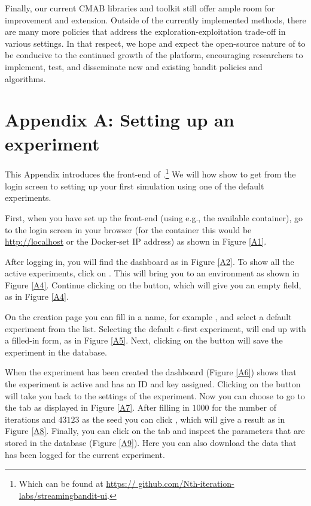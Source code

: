 \documentclass[nojss]{jss}
\begin{document}
Finally, our current CMAB libraries and toolkit still offer ample room for improvement and extension. Outside of the currently implemented methods, there are many more policies that address the exploration-exploitation trade-off in various settings. In that respect, we hope and expect the open-source nature of  to be conducive to the continued growth of the platform, encouraging researchers to implement, test, and disseminate new and existing bandit policies and algorithms.





\clearpage

\section*{Appendix A: Setting up an experiment}
\label{app:ui}

\renewcommand{\thefigure}{A\arabic{figure}}

\setcounter{figure}{0}

This Appendix introduces the front-end of .\footnote{Which can be found at \url{https:// github.com/Nth-iteration-labs/streamingbandit-ui}.} We will how show to get from the login screen to setting up your first simulation using one of the default experiments.

First, when you have set up the front-end (using e.g., the available  container), go to the login screen in your browser (for the  container this would be \url{http://localhost} or the Docker-set IP address) as shown in Figure \ref{A1}.

After logging in, you will find the dashboard as in Figure \ref{A2}. To show all the active experiments, click on . This will bring you to an environment as shown in Figure \ref{A4}. Continue clicking on the  button, which will give you an empty  field, as in Figure \ref{A4}.

On the creation page you can fill in a name, for example , and select a default experiment from the  list. Selecting the default $\epsilon$-first experiment, will end up with a filled-in form, as in Figure \ref{A5}. Next, clicking on the  button will save the experiment in the database.

When the experiment has been created the dashboard (Figure \ref{A6}) shows that the experiment is active and has an ID and key assigned. Clicking on the  button will take you back to the settings of the experiment. Now you can choose to go to the  tab as displayed in Figure \ref{A7}. After filling in $1000$ for the number of iterations and $43123$ as the seed you can click , which will give a result as in Figure \ref{A8}. Finally, you can click on the  tab and inspect the parameters that are stored in the database (Figure \ref{A9}). Here you can also download the data that has been logged for the current experiment.
\end{document}
